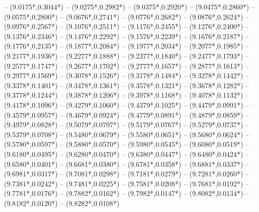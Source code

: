 {	-- ({9.0175*\dx},{0.3044*\dy})
	-- ({9.0275*\dx},{0.2982*\dy})
	-- ({9.0375*\dx},{0.2920*\dy})
	-- ({9.0475*\dx},{0.2860*\dy})
	-- ({9.0575*\dx},{0.2800*\dy})
	-- ({9.0676*\dx},{0.2741*\dy})
	-- ({9.0776*\dx},{0.2682*\dy})
	-- ({9.0876*\dx},{0.2624*\dy})
	-- ({9.0976*\dx},{0.2567*\dy})
	-- ({9.1076*\dx},{0.2511*\dy})
	-- ({9.1176*\dx},{0.2455*\dy})
	-- ({9.1276*\dx},{0.2400*\dy})
	-- ({9.1376*\dx},{0.2346*\dy})
	-- ({9.1476*\dx},{0.2292*\dy})
	-- ({9.1576*\dx},{0.2239*\dy})
	-- ({9.1676*\dx},{0.2187*\dy})
	-- ({9.1776*\dx},{0.2135*\dy})
	-- ({9.1877*\dx},{0.2084*\dy})
	-- ({9.1977*\dx},{0.2034*\dy})
	-- ({9.2077*\dx},{0.1985*\dy})
	-- ({9.2177*\dx},{0.1936*\dy})
	-- ({9.2277*\dx},{0.1888*\dy})
	-- ({9.2377*\dx},{0.1840*\dy})
	-- ({9.2477*\dx},{0.1793*\dy})
	-- ({9.2577*\dx},{0.1747*\dy})
	-- ({9.2677*\dx},{0.1702*\dy})
	-- ({9.2777*\dx},{0.1657*\dy})
	-- ({9.2877*\dx},{0.1613*\dy})
	-- ({9.2977*\dx},{0.1569*\dy})
	-- ({9.3078*\dx},{0.1526*\dy})
	-- ({9.3178*\dx},{0.1484*\dy})
	-- ({9.3278*\dx},{0.1442*\dy})
	-- ({9.3378*\dx},{0.1401*\dy})
	-- ({9.3478*\dx},{0.1361*\dy})
	-- ({9.3578*\dx},{0.1321*\dy})
	-- ({9.3678*\dx},{0.1282*\dy})
	-- ({9.3778*\dx},{0.1244*\dy})
	-- ({9.3878*\dx},{0.1206*\dy})
	-- ({9.3978*\dx},{0.1168*\dy})
	-- ({9.4078*\dx},{0.1132*\dy})
	-- ({9.4178*\dx},{0.1096*\dy})
	-- ({9.4279*\dx},{0.1060*\dy})
	-- ({9.4379*\dx},{0.1025*\dy})
	-- ({9.4479*\dx},{0.0991*\dy})
	-- ({9.4579*\dx},{0.0957*\dy})
	-- ({9.4679*\dx},{0.0924*\dy})
	-- ({9.4779*\dx},{0.0891*\dy})
	-- ({9.4879*\dx},{0.0859*\dy})
	-- ({9.4979*\dx},{0.0828*\dy})
	-- ({9.5079*\dx},{0.0797*\dy})
	-- ({9.5179*\dx},{0.0767*\dy})
	-- ({9.5279*\dx},{0.0737*\dy})
	-- ({9.5379*\dx},{0.0708*\dy})
	-- ({9.5480*\dx},{0.0679*\dy})
	-- ({9.5580*\dx},{0.0651*\dy})
	-- ({9.5680*\dx},{0.0624*\dy})
	-- ({9.5780*\dx},{0.0597*\dy})
	-- ({9.5880*\dx},{0.0570*\dy})
	-- ({9.5980*\dx},{0.0545*\dy})
	-- ({9.6080*\dx},{0.0519*\dy})
	-- ({9.6180*\dx},{0.0495*\dy})
	-- ({9.6280*\dx},{0.0470*\dy})
	-- ({9.6380*\dx},{0.0447*\dy})
	-- ({9.6480*\dx},{0.0424*\dy})
	-- ({9.6580*\dx},{0.0401*\dy})
	-- ({9.6681*\dx},{0.0380*\dy})
	-- ({9.6781*\dx},{0.0358*\dy})
	-- ({9.6881*\dx},{0.0337*\dy})
	-- ({9.6981*\dx},{0.0317*\dy})
	-- ({9.7081*\dx},{0.0298*\dy})
	-- ({9.7181*\dx},{0.0279*\dy})
	-- ({9.7281*\dx},{0.0260*\dy})
	-- ({9.7381*\dx},{0.0242*\dy})
	-- ({9.7481*\dx},{0.0225*\dy})
	-- ({9.7581*\dx},{0.0208*\dy})
	-- ({9.7681*\dx},{0.0192*\dy})
	-- ({9.7781*\dx},{0.0176*\dy})
	-- ({9.7882*\dx},{0.0162*\dy})
	-- ({9.7982*\dx},{0.0147*\dy})
	-- ({9.8082*\dx},{0.0134*\dy})
	-- ({9.8182*\dx},{0.0120*\dy})
	-- ({9.8282*\dx},{0.0108*\dy})
}
